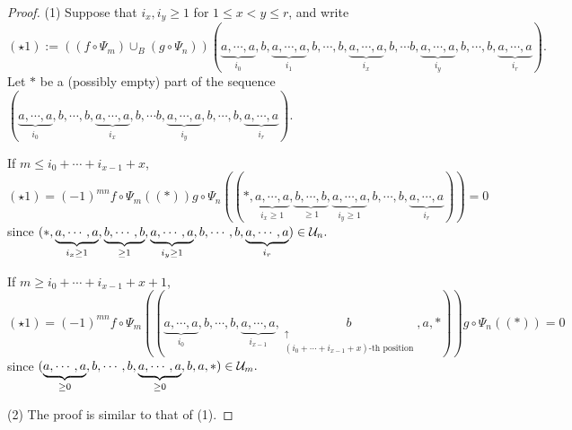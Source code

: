 \documentclass[10pt, reqno]{amsart}
\theoremstyle{definition}
\theoremstyle{remark}
\numberwithin{equation}{section}
\begin{document}
\begin{proof}
    (1) Suppose that $i_x,i_y\ge 1$ for $1\le x< y\le r$, and write
\[
(\star1):=((f\circ\Psi_m) \cup_B (g\circ\Psi_n))(\underbrace{a,\cdots,a}_{i_0},b,\underbrace{a,\cdots,a}_{i_1},b,\cdots,b,\underbrace{a,\cdots,a}_{i_x},b,\cdots b,\underbrace{a,\cdots,a}_{i_y},b,\cdots,b,\underbrace{a,\cdots,a}_{i_r}).
\]
Let $*$ be a  (possibly empty) part of the sequence $(\underbrace{a,\cdots,a}_{i_0},b,\cdots,b,\underbrace{a,\cdots,a}_{i_x},b,\cdots b,\underbrace{a,\cdots,a}_{i_y},b,\cdots,b,\underbrace{a,\cdots,a}_{i_r}).$

If \(m\le i_0+\cdots+i_{x-1}+x\),
\[
(\star1)=(-1)^{mn}f\circ\Psi_m((*)) g\circ\Psi_n((*,\underbrace{a,\cdots,a}_{i_x\ge1},\underbrace{b,\cdots,b}_{\ge1},\underbrace{a,\cdots,a}_{i_y\ge1},b,\cdots,b,\underbrace{a,\cdots,a}_{i_r}))=0
\]
since $(*,\underbrace{a,\cdots,a}_{i_x\ge1},\underbrace{b,\cdots,b}_{\ge1},\underbrace{a,\cdots,a}_{i_y\ge1},b,\cdots,b,\underbrace{a,\cdots,a}_{i_r})\in \mathcal{U}_n.$

If \(m\ge i_0+\cdots+i_{x-1}+x+1\),
\[
(\star1)=(-1)^{mn}f\circ\Psi_m((\underbrace{a,\cdots,a}_{i_0},b,\cdots,b,\underbrace{a,\cdots,a}_{i_{x-1}},\underset{\substack{\uparrow\\(i_0+\cdots+i_{x-1}+x)\text{-th position}}}{b},a,*)) g\circ\Psi_n((*))=0
\]
since $(\underbrace{a,\cdots,a}_{\ge 0},b,\cdots,b,\underbrace{a,\cdots,a}_{\ge 0},b,a,*)\in \mathcal{U}_m.$


(2) The proof is similar to that of (1). 

\end{proof}
\end{document}
